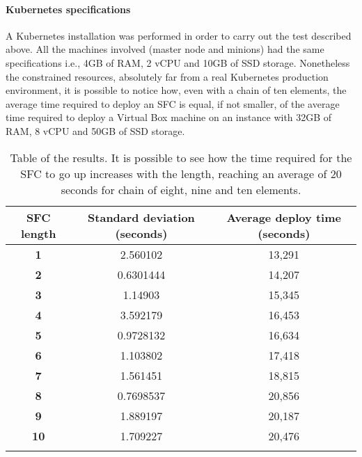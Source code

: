 \paragraph*{Kubernetes specifications}
A Kubernetes installation was performed in order to carry out the test
described above. All the machines involved (master node and minions) had the
same specifications i.e., 4GB of RAM, 2 vCPU and 10GB of SSD storage.
Nonetheless the constrained resources, absolutely far from a real Kubernetes
production environment, it is possible to notice how, even with a chain of ten
elements, the average time required to deploy an SFC is equal, if not smaller,
of the average time required to deploy a Virtual Box machine on an instance 
with 32GB of RAM, 8 vCPU and 50GB of SSD storage.

\begin{longtable}[c]{c|c|c}
\textbf{SFC length} & \textbf{Standard deviation (seconds)} & \textbf{Average 
deploy time (seconds)} \\ \hline
\endhead
%
\textbf{1}          & 2.560102                   & 13,291                     \\
\textbf{2}          & 0.6301444                  & 14,207                     \\
\textbf{3}          & 1.14903                    & 15,345                     \\
\textbf{4}          & 3.592179                   & 16,453                     \\
\textbf{5}          & 0.9728132                  & 16,634                     \\
\textbf{6}          & 1.103802                   & 17,418                     \\
\textbf{7}          & 1.561451                   & 18,815                     \\
\textbf{8}          & 0.7698537                  & 20,856                     \\
\textbf{9}          & 1.889197                   & 20,187                     \\
\textbf{10}         & 1.709227                   & 20,476                     \\
\caption[SFC start up time]{Table of the results. It is possible to see how the
  time required for the SFC to go up increases with the length, reaching an
  average of 20 seconds for chain of eight, nine and ten elements.}
\label{chap:tests:sec:sfclength:tab:sfcdata}\\
\end{longtable}


